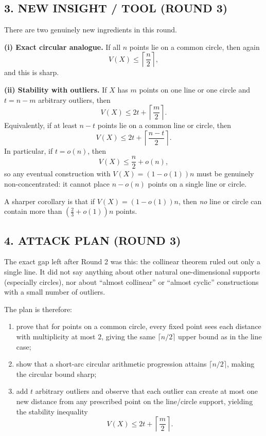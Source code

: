 \subsection*{3. NEW INSIGHT / TOOL (ROUND 3)}

There are two genuinely new ingredients in this round.

\medskip
\noindent
\textbf{(i) Exact circular analogue.}
If all \(n\) points lie on a common circle, then again
\[
V(X)\le \left\lceil\frac{n}{2}\right\rceil,
\]
and this is sharp.

\medskip
\noindent
\textbf{(ii) Stability with outliers.}
If \(X\) has \(m\) points on one line or one circle and \(t=n-m\) arbitrary outliers, then
\[
V(X)\le 2t+\left\lceil\frac{m}{2}\right\rceil.
\]
Equivalently, if at least \(n-t\) points lie on a common line or circle, then
\[
V(X)\le 2t+\left\lceil\frac{n-t}{2}\right\rceil.
\]
In particular, if \(t=o(n)\), then
\[
V(X)\le \frac{n}{2}+o(n),
\]
so any eventual construction with \(V(X)=(1-o(1))n\) must be genuinely non-concentrated: it cannot place \(n-o(n)\) points on a single line or circle.

\medskip
\noindent
A sharper corollary is that if \(V(X)=(1-o(1))n\), then \emph{no} line or circle can contain more than \((\tfrac23+o(1))n\) points.

\subsection*{4. ATTACK PLAN (ROUND 3)}

The exact gap left after Round 2 was this: the collinear theorem ruled out only a single line.  It did not say anything about other natural one-dimensional supports (especially circles), nor about ``almost collinear'' or ``almost cyclic'' constructions with a small number of outliers.

The plan is therefore:

\begin{enumerate}
\item prove that for points on a common circle, every fixed point sees each distance with multiplicity at most \(2\), giving the same \(\lceil n/2\rceil\) upper bound as in the line case;
\item show that a short-arc circular arithmetic progression attains \(\lceil n/2\rceil\), making the circular bound sharp;
\item add \(t\) arbitrary outliers and observe that each outlier can create at most one new distance from any prescribed point on the line/circle support, yielding the stability inequality
\[
V(X)\le 2t+\left\lceil\frac{m}{2}\right\rceil.
\]
\end{enumerate}

